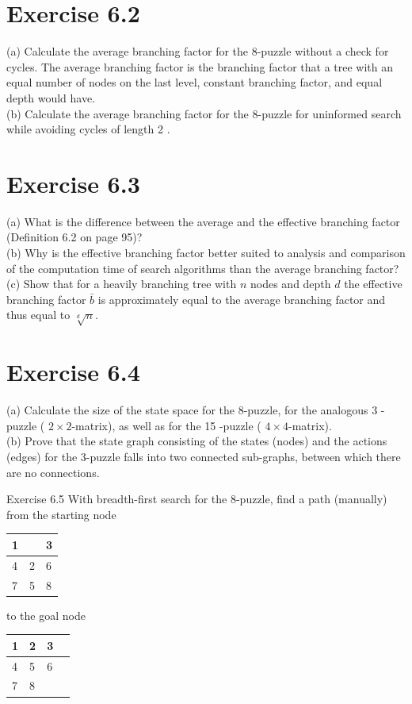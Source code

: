 \documentclass[10pt]{book}
\begin{document}
\begin{center}
\begin{enumerate}
\section*{Exercise 6.2}
(a) Calculate the average branching factor for the 8-puzzle without a check for cycles. The average branching factor is the branching factor that a tree with an equal number of nodes on the last level, constant branching factor, and equal depth would have.\\
(b) Calculate the average branching factor for the 8-puzzle for uninformed search while avoiding cycles of length 2 .

\section*{Exercise 6.3}
(a) What is the difference between the average and the effective branching factor (Definition 6.2 on page 95)?\\
(b) Why is the effective branching factor better suited to analysis and comparison of the computation time of search algorithms than the average branching factor?\\
(c) Show that for a heavily branching tree with $n$ nodes and depth $d$ the effective branching factor $\bar{b}$ is approximately equal to the average branching factor and thus equal to $\sqrt[d]{n}$.

\section*{Exercise 6.4}
(a) Calculate the size of the state space for the 8-puzzle, for the analogous 3 -puzzle ( $2 \times 2$-matrix), as well as for the 15 -puzzle ( $4 \times 4$-matrix).\\
(b) Prove that the state graph consisting of the states (nodes) and the actions (edges) for the 3-puzzle falls into two connected sub-graphs, between which there are no connections.

Exercise 6.5 With breadth-first search for the 8-puzzle, find a path (manually) from the starting node

\begin{center}
\begin{tabular}{|l|l|l|}
\hline
1 &  & 3 \\
\hline
4 & 2 & 6 \\
\hline
7 & 5 & 8 \\
\hline
\end{tabular}
\end{center} to the goal node \begin{tabular}{|l|l|l|l|}
\hline
1 & 2 & 3 \\
\hline
4 & 5 & 6 \\
\hline
7 & 8 &  \\
\hline
\end{tabular}


\end{enumerate}
\end{center}
\end{document}

